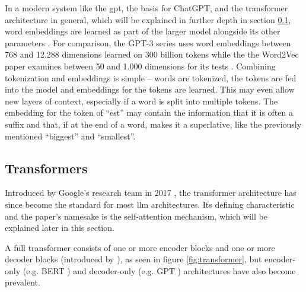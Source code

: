 In a modern system like the \ac{gpt}, the basis for ChatGPT, and the transformer architecture in general, which will be explained in further depth in section \ref{sec:transformer}, word embeddings are learned as part of the larger model alongside its other parameters \cite{Brown.2020}.
For comparison, the GPT-3 series uses word embeddings between 768 and 12.288 dimensions learned on 300 billion tokens \cite{Brown.2020} while the the Word2Vec paper examines between 50 and 1.000 dimensions for its tests \cite{Mikolov.2013b}.
Combining tokenization and embeddings is simple -- words are tokenized, the tokens are fed into the model and embeddings for the tokens are learned.
This may even allow new layers of context, especially if a word is split into multiple tokens.
The embedding for the token of \enquote{est} may contain the information that it is often a suffix and that, if at the end of a word, makes it a superlative, like the previously mentioned \enquote{biggest} and \enquote{smallest}.


\subsection{Transformers}
\label{sec:transformer}
Introduced by Google's research team in 2017 \cite{Vaswani.2017}, the transformer architecture has since become the standard for most \ac{llm} architectures.
Its defining characteristic and the paper's namesake is the self-attention mechanism, which will be explained later in this section.

A full transformer consists of one or more encoder blocks and one or more decoder blocks (introduced by \cite{Cho.2014}), as seen in figure \ref{fig:transformer}, but encoder-only (e.g. BERT \cite{Devlin.2019}) and decoder-only (e.g. GPT \cite{AlecRadfordKarthikNarasimhanTimSalimansIlyaSutskever.2018}) architectures have also become prevalent.

